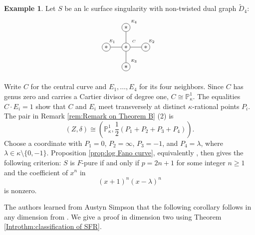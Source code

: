 \documentclass[12pt]{amsart}
\def\ge{\geqslant}
\newcommand{\PP}{\mathbb{P}}
\theoremstyle{plain}
\theoremstyle{definition}
\newtheorem{eg}[thm]{Example}
\theoremstyle{remark}
\newtheorem{defn and notation}[thm]{Definition and Notation}
\theoremstyle{plain}
\numberwithin{equation}{thm}
\begin{document}
\begin{eg}\label{eg:Theorem B for D4}
Let $S$ be an lc surface singularity with non-twisted dual graph $\widetilde D_4$:
            \[
\begin{tikzpicture}
\node[draw, shape=circle, inner sep=1.8pt] (E1 alpha) at (2,0){$*$};
\node[draw, shape=circle, inner sep=1.8pt] (C) at (3,0){$*$};
\node[draw, shape=circle, inner sep=1.8pt] (E1 Beta) at (4,0){$*$};
\node[draw, shape=circle, inner sep=1.8pt] (E1 gamma) at (3,-1){$*$};
\node[draw, shape=circle, inner sep=1.8pt] (E1 delta) at (3,1){$*$};

\draw[shift={(0.3,0.3)}] (2,0) node{\tiny $E_1$};
\draw[shift={(0.4,0.3)}] (3,0) node{\tiny $C$};
\draw[shift={(0.3,0.3)}] (4,0) node{\tiny $E_2$};
\draw[shift={(0.4,0.3)}] (3,-1) node{\tiny $E_3$};
\draw[shift={(0.4,0.3)}] (3,1) node{\tiny $E_4$};

\draw (E1 alpha)--(C);
\draw (C)--(E1 Beta);
\draw (C)--(E1 gamma);
\draw (C)--(E1 delta);
\end{tikzpicture}
        \]

Write $C$ for the central curve and $E_1,\ldots,E_4$ for its four neighbors.
Since $C$ has genus zero and carries a Cartier divisor of degree one, $C\cong\PP^1_\kappa$.
The equalities $C\cdot E_i=1$ show that $C$ and $E_i$ meet transversely at distinct $\kappa$-rational points $P_i$.
The pair in Remark \ref{rem:Remark on Theorem B} (2) is
\[
(Z,\delta)\cong
\left(\PP^1_\kappa,\frac12(P_1+P_2+P_3+P_4)\right).
\]
Choose a coordinate with $P_1=0$, $P_2=\infty$, $P_3=-1$, and $P_4=\lambda$, where $\lambda\in\kappa\setminus\{0,-1\}$.
Proposition \ref{prop:log Fano curve}, equivalently \cite[Theorem 1.2(3)(vi)]{Hara(two-dim)}, then gives the following criterion:
$S$ is $F$-pure if and only if $p=2n+1$ for some integer $n\ge1$ and the coefficient of $x^n$ in
\[
(x+1)^n(x-\lambda)^n
\]
is nonzero.
\end{eg}

The authors learned from Austyn Simpson that the following corollary follows in any dimension from \cite[Theorem 3.6]{Aberbach}.
We give a proof in dimension two using Theorem \ref{Introthm:classification of SFR}.
\end{document}
